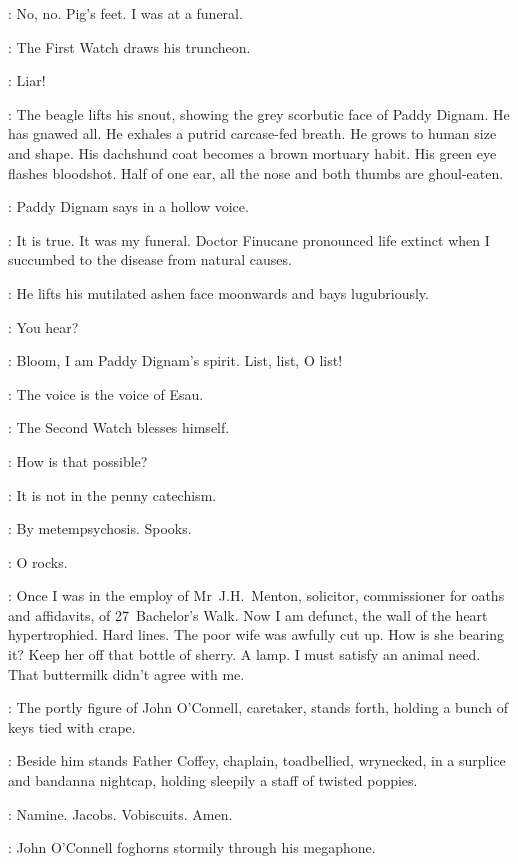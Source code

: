 \Bloom:
No,
no.
Pig's feet.
I was at a funeral.

:
The First Watch draws his truncheon.

\FirstWatch:
Liar!

:
The beagle lifts his snout,
showing the grey scorbutic face of Paddy Dignam.
He has gnawed all.
He exhales a putrid carcase-fed breath.
He grows to human size and shape.
His dachshund coat becomes a brown mortuary habit.
His green eye flashes bloodshot.
Half of one ear,
all the nose and both thumbs are ghoul-eaten.

:
Paddy Dignam says in a hollow voice.

\Dignam:
It is true.
It was my funeral.
Doctor Finucane pronounced life extinct
when I succumbed to the disease from natural causes.

:
He lifts his mutilated ashen face moonwards and bays lugubriously.

\Bloom:
You hear?

\Dignam:
Bloom,
I am Paddy Dignam's spirit.
List,
list,
O list!

\Bloom:
The voice is the voice of Esau.

:
The Second Watch blesses himself.

\SecondWatch:
How is that possible?

\FirstWatch:
It is not in the penny catechism.

\Dignam:
By metempsychosis.
Spooks.

\Voice:
O rocks.

\Dignam:
Once I was in the employ of Mr~J.H.~Menton,
solicitor,
commissioner for oaths and affidavits,
of 27~Bachelor's Walk.
Now I am defunct,
the wall of the heart hypertrophied.
Hard lines.
The poor wife was awfully cut up.
How is she bearing it?
Keep her off that bottle of sherry.
A lamp.
I must satisfy an animal need.
That buttermilk didn't agree with me.

:
The portly figure of John O'Connell,
caretaker,
stands forth,
holding a bunch of keys tied with crape.

:
Beside him stands Father Coffey,
chaplain,
toadbellied,
wrynecked,
in a surplice and bandanna nightcap,
holding sleepily a staff of twisted poppies.

\FrCoffey:
Namine.
Jacobs.
Vobiscuits.
Amen.

:
John O'Connell foghorns stormily through his megaphone.

